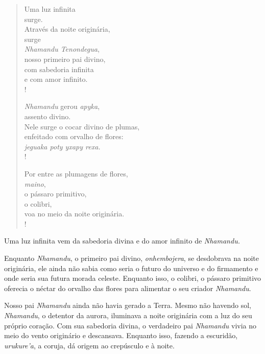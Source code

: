 
 

\begin{verse}
Uma luz infinita\\
surge.\\
Através da noite originária,\\
surge\\
\emph{Nhamandu Tenondegua},\\
nosso primeiro pai divino,\\
com sabedoria infinita\\
e com amor infinito.\\!
 

\emph{Nhamandu} gerou \emph{apyka},\\
assento divino.\\
Nele surge o cocar divino de plumas,\\
enfeitado com orvalho de flores:\\
\emph{jeguaka poty yxapy rexa.}\\!

Por entre as plumagens de flores,\\
\emph{maino},\\
o pássaro primitivo,\\
o colibri,\\
voa no meio da noite originária.\\!
\end{verse}

Uma luz infinita vem da sabedoria divina e do amor infinito
de \emph{Nhamandu.}

 

\asterisc{}


Enquanto \emph{Nhamandu}, o primeiro pai divino, \emph{onhembojera}, se
desdobrava na noite originária, ele ainda não sabia como seria o futuro
do universo e do firmamento e onde seria sua futura morada celeste.
Enquanto isso, o colibri, o pássaro primitivo oferecia o néctar do
orvalho das flores para alimentar o seu criador \emph{Nhamandu}.

Nosso pai \emph{Nhamandu} ainda não havia gerado a Terra. Mesmo não
havendo sol, \emph{Nhamandu}, o detentor da aurora, iluminava a noite
originária com a luz do seu próprio coração. Com sua sabedoria divina, o
verdadeiro pai \emph{Nhamandu} vivia no meio do vento originário e
descansava. Enquanto isso, fazendo a escuridão, \emph{urukure'a}, a
coruja, dá origem ao crepúsculo e à noite.

